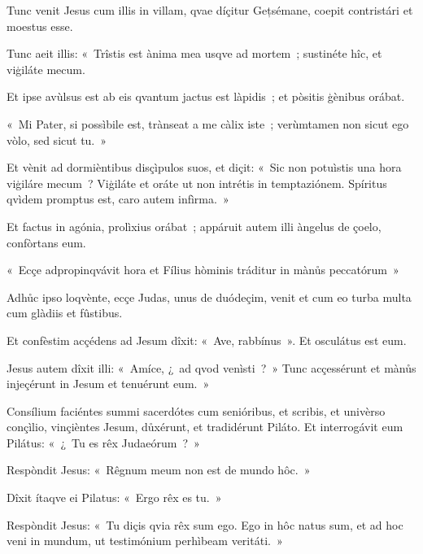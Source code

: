 
Tunc venit Jesus cum illis in villam, qvae díçitur Gețsémane, coepit contristári et moestus esse.

Tunc aeit illis: «~Trîstis est ànima mea usqve ad mortem~; sustinéte hîc, et viģiláte mecum.

Et ipse avùlsus est ab eis qvantum jactus est làpidis~; et pòsitis ģènibus orábat.

«~Mi Pater, si possìbile est, trànseat a me càlix iste~; verùmtamen non sicut ego vòlo, sed sicut tu.~»

Et vènit ad dormièntibus disçìpulos suos, et diçit: «~Sic non potuìstis una hora viģiláre mecum~? Viģiláte et oráte ut non intrétis in temptaziónem. Spíritus qvìdem promptus est, caro autem infìrma.~»

Et factus in agónia, prolìxius orábat~; appáruit autem illi àngelus de çoelo, confòrtans eum.

«~Ecçe adpropinqvávit hora et Fílius hòminis tráditur in mànůs peccatórum~»

Adhůc ipso loqvènte, ecçe Judas, unus de duódeçim, venit et cum eo turba multa cum glàdiis et fûstibus.

Et confèstim acçédens ad Jesum dîxit: «~Ave, rabbínus~». Et osculátus est eum.

Jesus autem dîxit illi: «~Amíce, ¿~ad qvod venìsti~?~» Tunc acçessérunt et mànůs injeçérunt in Jesum et tenuérunt eum.~»


Consílium faciéntes summi sacerdótes cum senióribus, et scribis, et univèrso conçìlio, vinçièntes Jesum, důxérunt, et tradidérunt Piláto. Et interrogávit eum Pilátus: «~¿~Tu es rêx Judaeórum~?~»

Respòndit Jesus: «~Rêgnum meum non est de mundo hôc.~»

Dîxit ítaqve ei Pilatus: «~Ergo rêx es tu.~»

Respòndit Jesus: «~Tu diçis qvia rêx sum ego. Ego in hôc natus sum, et ad hoc veni in mundum, ut testimónium perhìbeam veritáti.~»

